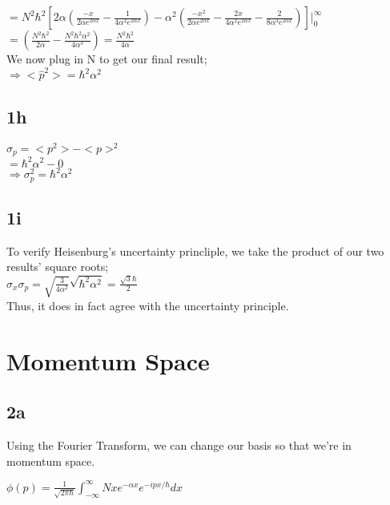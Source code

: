 \documentclass{article}
\begin{document}
$=N^2\hbar^2[2\alpha(\frac{-x}{2\alpha e^{2\alpha x}}-\frac{1}{4\alpha^2 e^{2\alpha x}})-\alpha^2(\frac{-x^2}{2\alpha e^{2\alpha x}}-\frac{2x}{4\alpha^2 e^{2\alpha x}}-\frac{2}{8\alpha^3 e^{2\alpha x}})]|_0^\infty$\\

$=(\frac{N^2\hbar^2}{2\alpha}-\frac{N^2\hbar^2\alpha^2}{4\alpha^3})=\frac{N^2\hbar^2}{4\alpha}$\\

We now plug in N to get our final result;\\

$\Rightarrow<\hat{p}^2>=\hbar^2\alpha^2$\\

\subsection*{1h}

$\sigma_p=<p^2>-<p>^2$\\

$=\hbar^2\alpha^2-0$\\

$\Rightarrow\sigma_p^2=\hbar^2\alpha^2$\\

\subsection*{1i}

To verify Heisenburg's uncertainty princliple, we take the product of our two results' square roots;\\

$\sigma_x\sigma_p=\sqrt{\frac{3}{4\alpha^2}}\sqrt{\hbar^2\alpha^2}=\frac{\sqrt{3}\hbar}{2}$\\

Thus, it does in fact agree with the uncertainty principle.\\
%
%
%
%
%
%
%
%
\section*{Momentum Space}
\subsection*{2a}

Using the Fourier Transform, we can change our basis so that we're in momentum space.

$\phi(p)=\frac{1}{\sqrt{2\pi\hbar}}{\displaystyle \int_{-\infty}^{\infty} } Nxe^{-\alpha x}e^{-ipx/\hbar}dx$\\
\end{document}

